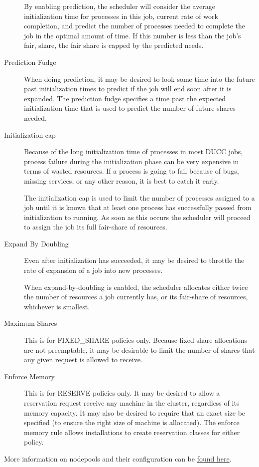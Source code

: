 \begin{description}
          By enabling prediction, the scheduler will consider the average initialization time for processes 
          in this job, current rate of work completion, and predict the number of processes needed to 
          complete the job in the optimal amount of time. If this number is less than the job's fair, share, 
          the fair share is capped by the predicted needs. 
          
        \item[Prediction Fudge] When doing prediction, it may be desired to look some time into the
          future past initialization times to predict if the job will end soon after it is expanded. The
          prediction fudge specifies a time past the expected initialization time that is used to
          predict the number of future shares needed.

        \item[Initialization cap] Because of the long initialization time of processes in most DUCC jobs,
          process failure during the initialization phase can be very expensive in terms of wasted
          resources. If a process is going to fail because of bugs, missing services, or any other
          reason, it is best to catch it early.

          The initialization cap is used to limit the number of processes assigned to a job until it is 
          known that at least one process has successfully passed from initialization to running. As soon 
          as this occurs the scheduler will proceed to assign the job its full fair-share of resources. 

        \item[Expand By Doubling] Even after initialization has succeeded, it may be desired to throttle
          the rate of expansion of a job into new processes.

          When expand-by-doubling is enabled, the scheduler allocates either twice the number of 
          resources a job currently has, or its fair-share of resources, whichever is smallest. 

        \item[Maximum Shares] This is for FIXED\_SHARE policies only. Because fixed share allocations are
          not preemptable, it may be desirable to limit the number of shares that any given request is
          allowed to receive.

        \item[Enforce Memory] This is for RESERVE policies only. It may be desired to allow a
          reservation request receive any machine in the cluster, regardless of its memory capacity. It
          may also be desired to require that an exact size be specified (to ensure the right size of
          machine is allocated). The enforce memory rule allows installations to create reservation
          classes for either policy.
    \end{description}
        
    More information on nodepools and their configuration can be \hyperref[subsubsec:class.configuration]{found here}.
